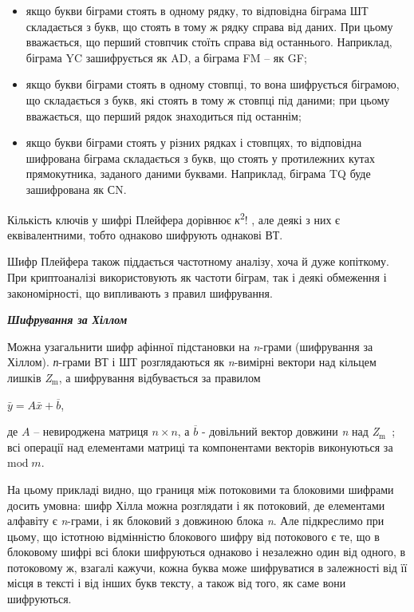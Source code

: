 \documentclass[a4paper]{article}
\newcommand\textsubscript[1]{\ensuremath{{}_{\text{#1}}}}
\newcommand\liststyleWWviiiNumxxx{%
\renewcommand\labelitemi{{}-}
\renewcommand\labelitemii{o}
\renewcommand\labelitemiii{\textlatin{[F0A7?]}}
\renewcommand\labelitemiv{\textlatin{[F0B7?]}}
}
\newcounter{}
\begin{document}
\liststyleWWviiiNumxxx
\begin{itemize}
\item якщо букви біграми стоять в одному рядку, то відповідна біграма ШТ
складається з букв, що стоять в тому ж рядку справа від даних. При цьому
вважається, що перший стовпчик стоїть справа від останнього. Наприклад, біграма
YC зашифрується як AD, а біграма FM – як GF;
\item якщо букви біграми стоять в одному стовпці, то вона шифрується біграмою,
що складається з букв, які стоять в тому ж стовпці під даними; при цьому
вважається, що перший рядок знаходиться під останнім;
\item якщо букви біграми стоять у різних рядках і стовпцях, то відповідна
шифрована біграма складається з букв, що стоять у протилежних кутах
прямокутника, заданого даними буквами. Наприклад, біграма TQ буде зашифрована
як СN.
\end{itemize}
Кількість ключів у шифрі Плейфера дорівнює \textit{к}\textsuperscript{2}!  , але
деякі з них є еквівалентними, тобто однаково шифрують однакові ВТ.

Шифр Плейфера також піддається частотному аналізу, хоча й дуже копіткому. При
криптоаналізі використовують як частоти біграм, так і деякі обмеження і
закономірності, що випливають з правил шифрування.


\bigskip


\bigskip

{\centering\bfseries\itshape
Шифрування за Хіллом
\par}


\bigskip


\bigskip

Можна узагальнити шифр афінної підстановки на \textit{n}{}-грами (шифрування за
Хіллом). \textit{п}{}-грами ВТ і ШТ розглядаються як \textit{n}{}-вимірні
вектори над кільцем лишків \textit{Z}\textit{\textsubscript{m}}, а шифрування
відбувається за правилом

{\centering
 ${\bar{{y}}=A\bar{{x}}+\overline{{b}}}$,
\par}

де  ${A}$ – невироджена матриця   ${n\times n}$, а  ${\overline{{b}}}$ -
довільний вектор довжини \textit{n} над
\textit{Z}\textit{\textsubscript{m}}\textsubscript{ }; всі операції над
елементами матриці та компонентами векторів виконуються за  ${\text{mod}\;m}$.

На цьому прикладі видно, що границя між потоковими та блоковими шифрами досить
умовна: шифр Хілла можна розглядати і як потоковий, де елементами алфавіту є
\textit{n}{}-грами, і як блоковий з довжиною блока \textit{n}. Але підкреслимо
при цьому, що істотною відмінністю блокового шифру від потокового є те, що в
блоковому шифрі всі блоки шифруються однаково і незалежно один від одного, в
потоковому ж, взагалі кажучи, кожна буква може шифруватися в залежності від її
місця в тексті і від інших букв тексту, а також від того, як саме вони
шифруються.
\end{document}

